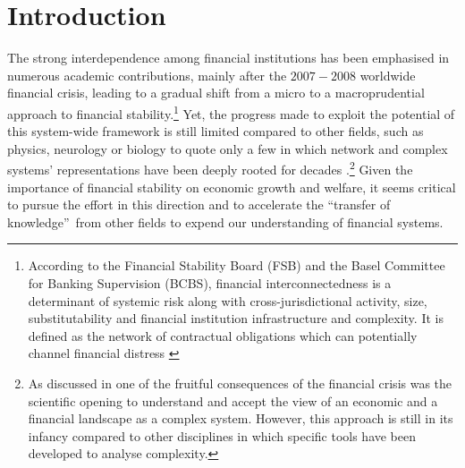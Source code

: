 \documentclass[a4paper,10pt]{article}
\begin{document}
\newpage \baselineskip1.0cm
\singlespacing

\section{Introduction}
The strong interdependence among financial institutions has been emphasised in numerous academic contributions, mainly after 
the $2007-2008$ worldwide financial crisis, leading to a gradual shift from a micro to a macroprudential approach to financial 
stability.\footnote{According to the Financial Stability Board (FSB) and the Basel Committee for Banking Supervision (BCBS), 
financial interconnectedness is a determinant of systemic risk along with cross-jurisdictional activity, size, substitutability 
and financial institution infrastructure and complexity. It is defined as the network of contractual obligations which can 
potentially channel financial distress \cite{Basel}} Yet, the progress made to exploit the potential
of this  system-wide framework is still limited compared to other fields, such as physics, neurology or biology to quote only
a few in which network and complex systems' representations have been deeply rooted for decades  
\cite{bouchaud2008,farmer2009}.\footnote{As discussed in \cite{bouchaud2008,farmer2009} one of the fruitful consequences of the 
financial crisis was the scientific opening to understand and accept the view of an economic and a financial landscape as a 
complex system. However, this approach is still in its infancy compared to other disciplines in which specific tools have been
developed to analyse complexity.} Given the importance of financial stability  on  economic growth and welfare,
it seems critical to pursue the effort in this direction and to accelerate the \textquotedblleft transfer of 
knowledge\textquotedblright\ from other fields to expend our understanding of financial systems.  
 
\end{document}
